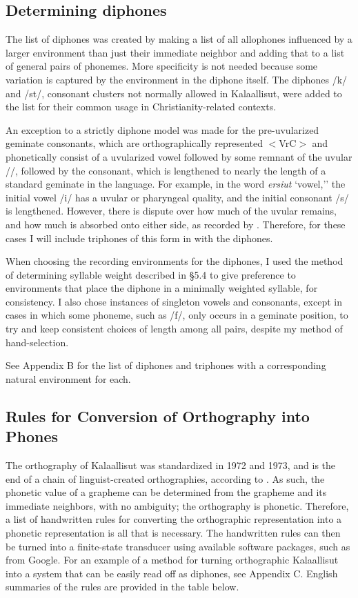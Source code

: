 \documentclass[12pt]{article}
\begin{document}
	\subsection{Determining diphones}

	The list of diphones was created by making a list of all allophones influenced by a larger environment than just their immediate neighbor and adding that to a list of general pairs of phonemes. More specificity is not needed because some variation is captured by the environment in the diphone itself. The diphones /k\textinvscr/ and /st/, consonant clusters not normally allowed in Kalaallisut, were added to the list for their common usage in Christianity-related contexts.\par
	An exception to a strictly diphone model was made for the pre-uvularized geminate consonants, which are orthographically represented $<$VrC$>$ and phonetically consist of a uvularized vowel followed by some remnant of the uvular /\textinvscr/, followed by the consonant, which is lengthened to nearly the length of a standard geminate in the language. For example, in the word \textit{ersiut} `vowel,'' the initial vowel /i/ has a uvular or pharyngeal quality, and the initial consonant /s/ is lengthened. However, there is dispute over how much of the uvular remains, and how much is absorbed onto either side, as recorded by \citet{rischel}. Therefore, for these cases I will include triphones of this form in with the diphones. \par
	When choosing the recording environments for the diphones, I used the method of determining syllable weight described in \S 5.4 to give preference to environments that place the diphone in a minimally weighted syllable, for consistency. I also chose instances of singleton vowels and consonants, except in cases in which some phoneme, such as /f/, only occurs in a geminate position, to try and keep consistent choices of length among all pairs, despite my method of hand-selection. \par
	See Appendix B for the list of diphones and triphones with a corresponding natural environment for each. \par

	\subsection{Rules for Conversion of Orthography into Phones}

	The orthography of Kalaallisut was standardized in 1972 and 1973, and is the end of a chain of linguist-created orthographies, according to \citet{rischel}. As such, the phonetic value of a grapheme can be determined from the grapheme and its immediate neighbors, with no ambiguity; the orthography is phonetic. Therefore, a list of handwritten rules for converting the orthographic representation into a phonetic representation is all that is necessary. The handwritten rules can then be turned into a finite-state transducer using available software packages, such as from Google. For an example of a method for turning orthographic Kalaallisut into a system that can be easily read off as diphones, see Appendix C. English summaries of the rules are provided in the table below.\par
\end{document}
